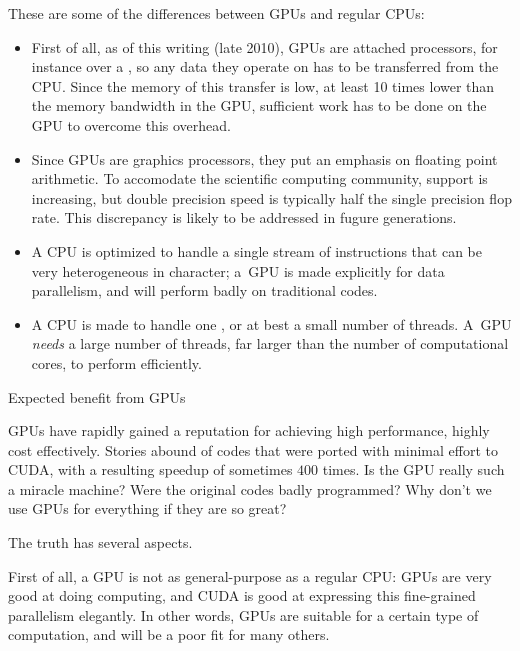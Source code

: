 These are some of the  differences between \acp{GPU} and regular CPUs:
\begin{itemize}
\item First of all, as of this writing (late 2010), \acp{GPU} are
  attached processors, for instance over a ,
  so any data they operate on has to be
  transferred from the CPU. Since the memory  of
  this transfer is low, at least 10 times lower than the memory
  bandwidth in the \ac{GPU}, sufficient work has to be done on the \ac{GPU}
  to overcome this overhead.
\item Since \acp{GPU} are graphics processors, they put an emphasis on
   floating point arithmetic. To
  accomodate the scientific computing community,  support is increasing, but double precision speed is
  typically half the single precision flop rate. This discrepancy is
  likely to be addressed in fugure generations.
\item A CPU is optimized to handle a single stream of instructions
  that can be very heterogeneous in character; a~\ac{GPU} is made
  explicitly for data parallelism, and will perform badly on
  traditional codes.
\item A CPU is made to handle one , or at best a
  small number of threads. A~\ac{GPU} \emph{needs} a large number of
  threads, far larger than the number of computational cores, to
  perform efficiently.
\end{itemize}

 {Expected benefit from GPUs}

\acp{GPU} have rapidly gained a reputation for achieving high
performance, highly cost effectively. Stories abound of codes that
were ported with minimal effort to CUDA, with a resulting speedup of
sometimes $400$ times. Is the GPU really such a miracle machine? Were
the original codes badly programmed? Why don't we use GPUs for
everything if they are so great?

The truth has several aspects. 

First of all, a \ac{GPU} is not as general-purpose as a regular CPU:
\acp{GPU} are very good at doing  computing,
and CUDA is good at expressing this fine-grained parallelism
elegantly. In other words, \acp{GPU} are suitable for a certain type
of computation, and will be a poor fit for many others.

